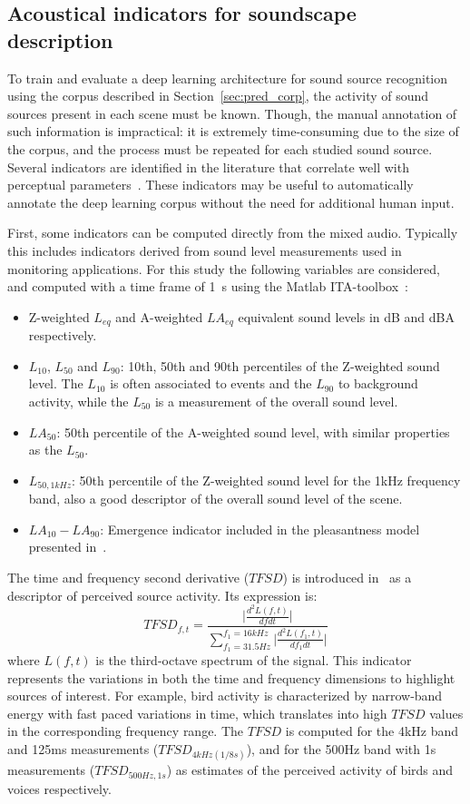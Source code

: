 \documentclass[twocolumn]{article}
\begin{document}
\subsection{Acoustical indicators for soundscape description}
\label{sec:pred_inds}

To train and evaluate a deep learning architecture for sound source recognition using the corpus described in Section~\ref{sec:pred_corp}, the activity of sound sources present in each scene must be known. Though, the manual annotation of such information is impractical: it is extremely time-consuming due to the size of the corpus, and the process must be repeated for each studied sound source. Several indicators are identified in the literature that correlate well with perceptual parameters~\cite{aumond2017, gontier2018, ricciardi2014}. These indicators may be useful to automatically annotate the deep learning corpus without the need for additional human input.

First, some indicators can be computed directly from the mixed audio. Typically this includes indicators derived from sound level measurements used in monitoring applications. For this study the following variables are considered, and computed with a time frame of 1~s using the Matlab ITA-toolbox~\cite{itatoolbox2017}:
\begin{itemize}
\item Z-weighted $L_{eq}$ and A-weighted $LA_{eq}$ equivalent sound levels in dB and dBA respectively.
\item $L_{10}$, $L_{50}$ and $L_{90}$: 10th, 50th and 90th percentiles of the Z-weighted sound level. The $L_{10}$ is often associated to events and the $L_{90}$ to background activity, while the $L_{50}$ is a measurement of the overall sound level.
\item $LA_{50}$: 50th percentile of the A-weighted sound level, with similar properties as the $L_{50}$.
\item $L_{50, 1kHz}$: 50th percentile of the Z-weighted sound level for the 1kHz frequency band, also a good descriptor of the overall sound level of the scene.
\item $LA_{10}-LA_{90}$: Emergence indicator included in the pleasantness model presented in~\cite{ricciardi2014}.
\end{itemize}
The time and frequency second derivative ($TFSD$) is introduced in~\cite{aumond2017} as a descriptor of perceived source activity. Its expression is:
\begin{equation}
TFSD_{f, t} = \frac{\lvert\frac{d^2L(f, t)}{dfdt}\rvert}{\sum_{f_1=31.5Hz}^{f_1=16kHz}\lvert\frac{d^2L(f_1, t)}{df_1dt}\rvert}
\end{equation}
where $L(f, t)$ is the third-octave spectrum of the signal. This indicator represents the variations in both the time and frequency dimensions to highlight sources of interest. For example, bird activity is characterized by narrow-band energy with fast paced variations in time, which translates into high $TFSD$ values in the corresponding frequency range. The $TFSD$ is computed for the 4kHz band and 125ms measurements ($TFSD_{4kHz(1/8s)}$), and for the 500Hz band with 1s measurements ($TFSD_{500Hz, 1s}$) as estimates of the perceived activity of birds and voices respectively.
\end{document}
